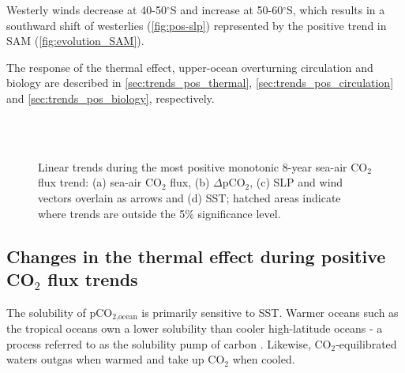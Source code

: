 Westerly winds decrease at 40-50$^\circ$S and increase at 50-60$^\circ$S, which results in a southward shift of westerlies (\autoref{fig:pos-slp}) represented by the positive trend in \acs{SAM} (\autoref{fig:evolution_SAM}). \newline


The response of the thermal effect, upper-ocean overturning circulation and biology are described in \autoref{sec:trends_pos_thermal}, \ref{sec:trends_pos_circulation} and \ref{sec:trends_pos_biology}, respectively.

\begin{figure}[bth]
        \myfloatalign
         \\
         
         \\
        \caption{Linear trends during the most positive monotonic 8-year sea-air CO$_2$ flux trend: (a) sea-air CO$_2$ flux, (b) $\Delta$pCO$_2$, (c) \ac{SLP} and wind vectors overlain as arrows and (d) \acf{SST}; hatched areas indicate where trends are outside the 5\% significance level.} \label{fig:pos}
\end{figure}



\clearpage

\subsection{Changes in the thermal effect during positive CO$_2$ flux trends}
\label{sec:trends_pos_thermal}
The solubility of pCO$_{\text{2,ocean}}$ is primarily sensitive to \acf{SST}. Warmer oceans such as the tropical oceans own a lower solubility than cooler high-latitude oceans - a process referred to as the solubility pump of carbon \citep{VolkHoffert1985}. Likewise, CO$_2$-equilibrated waters outgas when warmed and take up CO$_2$ when cooled.

